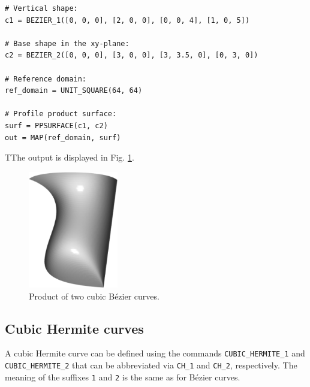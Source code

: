 \begin{bbox}
\begin{verbatim}
# Vertical shape:
c1 = BEZIER_1([0, 0, 0], [2, 0, 0], [0, 0, 4], [1, 0, 5])

# Base shape in the xy-plane:
c2 = BEZIER_2([0, 0, 0], [3, 0, 0], [3, 3.5, 0], [0, 3, 0])

# Reference domain:
ref_domain = UNIT_SQUARE(64, 64)

# Profile product surface: 
surf = PPSURFACE(c1, c2)
out = MAP(ref_domain, surf)
\end{verbatim}
\end{bbox}
\vspace{6mm}

\noindent
TThe output is displayed in Fig. \ref{fig:curves-13}.\\

\begin{figure}[!ht]
\begin{center}
\includegraphics[width=0.35\textwidth]{img/curves-13.png}
\end{center}
\vspace{-4mm}
\caption{Product of two cubic B\'ezier curves.}
\label{fig:curves-13}
\end{figure}

\subsection{Cubic Hermite curves}

A cubic Hermite curve can be defined using the commands 
{\tt CUBIC\_HERMITE\_1} and {\tt CUBIC\_HERMITE\_2} that 
can be abbreviated via {\tt CH\_1} and {\tt CH\_2}, respectively.
The meaning of the suffixes {\tt 1} and {\tt 2} is the same as 
for B\'ezier curves. 

